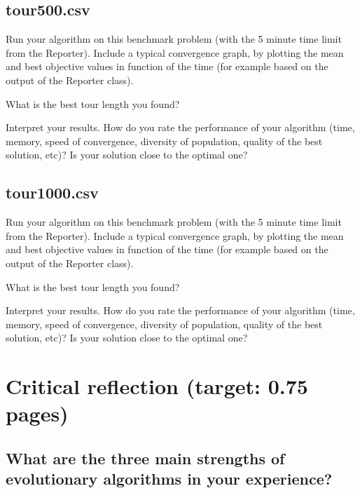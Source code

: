 \documentclass[a4paper,10pt]{article}
\newcommand{\ReplaceMe}[1]{{\color{blue}#1}}
\newcommand{\RemoveMe}[1]{{\color{purple}#1}}
\begin{document}
\subsection{tour500.csv}

\ReplaceMe{Run your algorithm on this benchmark problem (with the 5 minute time limit from the Reporter). Include a typical convergence graph, by plotting the mean and best objective values in function of the time (for example based on the output of the Reporter class). 

What is the best tour length you found? 

Interpret your results. How do you rate the performance of your algorithm (time, memory, speed of convergence, diversity of population, quality of the best solution, etc)? Is your solution close to the optimal one?}

\subsection{tour1000.csv}

\ReplaceMe{Run your algorithm on this benchmark problem (with the 5 minute time limit from the Reporter). Include a typical convergence graph, by plotting the mean and best objective values in function of the time (for example based on the output of the Reporter class). 

What is the best tour length you found? 

Interpret your results. How do you rate the performance of your algorithm (time, memory, speed of convergence, diversity of population, quality of the best solution, etc)? Is your solution close to the optimal one? }


\section{Critical reflection (target: 0.75 pages)}


\subsection{What are the three main strengths of evolutionary algorithms in your experience?}
\end{document}
